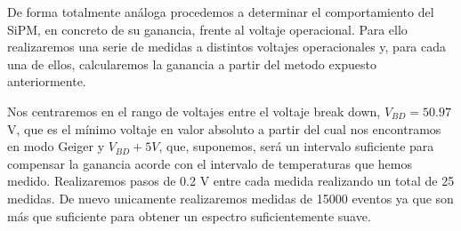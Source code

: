 De forma totalmente análoga procedemos a determinar el comportamiento del SiPM, en concreto de su ganancia, frente al voltaje operacional. Para ello realizaremos una serie de medidas a distintos voltajes operacionales y, para cada una de ellos, calcularemos la ganancia a partir del metodo expuesto anteriormente. 

Nos centraremos en el rango de voltajes entre el voltaje break down, $V_{BD}= 50.97$ V, que es el mínimo voltaje en valor absoluto a partir del cual nos encontramos en modo Geiger y $V_{BD}+5V$, que, suponemos, será un intervalo suficiente para compensar la ganancia acorde con el intervalo de temperaturas que hemos medido. Realizaremos pasos de 0.2 V entre cada medida realizando un total de 25 medidas. De nuevo unicamente realizaremos medidas de 15000 eventos ya que son más que suficiente para obtener un espectro suficientemente suave.

